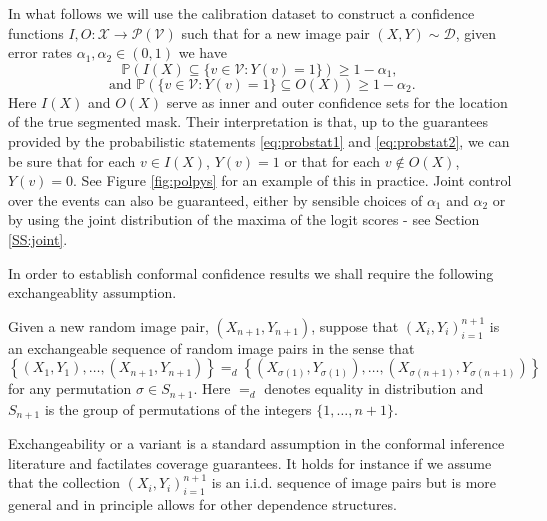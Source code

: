 In what follows we will use the calibration dataset to construct a confidence functions $I,O:  \mathcal{X}  \rightarrow \mathcal{P}(\mathcal{V})$ such that for a new image pair $(X,Y) \sim \mathcal{D}$, given error rates $\alpha_1, \alpha_2 \in (0,1)$ we have
\begin{equation}\label{eq:probstat1}
	\mathbb{P}\left( I(X) \subseteq \lbrace v\in \mathcal{V}: Y(v) = 1 \rbrace  \right) \geq 1 - \alpha_1, 
\end{equation}
\begin{equation}\label{eq:probstat2}
	\text{ and } 	\mathbb{P}\left( \lbrace v\in \mathcal{V}: Y(v) = 1 \rbrace \subseteq O(X)  \right) \geq 1 - \alpha_2.
\end{equation}
Here $I(X)$ and $O(X)$ serve as inner and outer confidence sets for the location of the true segmented mask. Their interpretation is that, up to the guarantees provided by the probabilistic statements \eqref{eq:probstat1} and \eqref{eq:probstat2}, we can be sure that for each $v\in I(X)$, $Y(v) = 1$ or that for each $v \not\in O(X)$, $Y(v) = 0$. See Figure \ref{fig:polpys} for an example of this in practice. Joint control over the events can also be guaranteed, either by sensible choices of $\alpha_1$ and $\alpha_2$ or by using the joint distribution of the maxima of the logit scores - see Section \ref{SS:joint}. 

In order to establish conformal confidence results we shall require the following exchangeablity assumption. 
\begin{assumption}\label{ass:ex}
		Given a new random image pair, $(X_{n+1},Y_{n+1})$, suppose that $(X_i, Y_i)_{i = 1}^{n+1}$ is an exchangeable sequence of random image pairs in the sense that 
	\begin{equation*}
		\left\lbrace (X_1,Y_1), \dots, (X_{n+1}, Y_{n+1}) \right\rbrace =_d \left\lbrace (X_{\sigma(1)}, Y_{\sigma(1)}), \dots, (X_{\sigma(n+1)}, Y_{\sigma(n+1)}) \right\rbrace
	\end{equation*}
	for any permutation $\sigma \in S_{n+1}$. Here $=_d$ denotes equality in distribution and $S_{n+1} $ is the group of permutations of the integers $\lbrace1, \dots, n+1\rbrace$.
\end{assumption}
Exchangeability or a variant is a standard assumption in the conformal inference literature \citep{Angelopoulos2021} and factilates coverage guarantees. It holds for instance if we assume that the collection $(X_i, Y_i)_{i = 1}^{n+1}$ is an i.i.d. sequence of image pairs but is more general and in principle allows for other dependence structures. 

